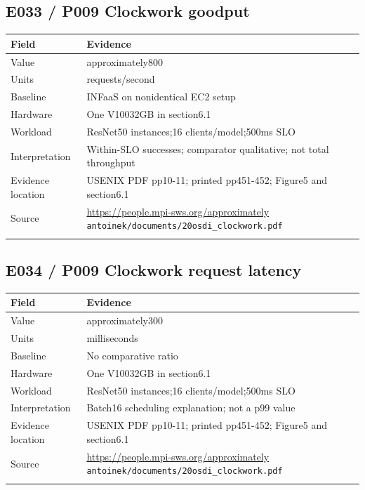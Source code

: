 \subsection*{E033 / P009 Clockwork goodput}

\begin{longtable}{>{\raggedright\arraybackslash}p{}>{\raggedright\arraybackslash}p{}}
\toprule
\textbf{Field} & \textbf{Evidence}\\\midrule\endhead
Value & approximately800\\\addlinespace
Units & requests/second\\\addlinespace
Baseline & INFaaS on nonidentical EC2 setup\\\addlinespace
Hardware & One V10032GB in section6.1\\\addlinespace
Workload & 15 ResNet50 instances;16 clients/model;500ms SLO\\\addlinespace
Interpretation & Within-SLO successes; comparator qualitative; not total throughput\\\addlinespace
Evidence location & USENIX PDF pp10-11; printed pp451-452; Figure5 and section6.1\\\addlinespace
Source & \url{https://people.mpi-sws.org/approximately} \nolinkurl{antoinek/documents/20osdi_clockwork.pdf}\\\addlinespace
\bottomrule\end{longtable}

\subsection*{E034 / P009 Clockwork request latency}

\begin{longtable}{>{\raggedright\arraybackslash}p{}>{\raggedright\arraybackslash}p{}}
\toprule
\textbf{Field} & \textbf{Evidence}\\\midrule\endhead
Value & approximately300\\\addlinespace
Units & milliseconds\\\addlinespace
Baseline & No comparative ratio\\\addlinespace
Hardware & One V10032GB in section6.1\\\addlinespace
Workload & 15 ResNet50 instances;16 clients/model;500ms SLO\\\addlinespace
Interpretation & Batch16 scheduling explanation; not a p99 value\\\addlinespace
Evidence location & USENIX PDF pp10-11; printed pp451-452; Figure5 and section6.1\\\addlinespace
Source & \url{https://people.mpi-sws.org/approximately} \nolinkurl{antoinek/documents/20osdi_clockwork.pdf}\\\addlinespace
\bottomrule\end{longtable}

